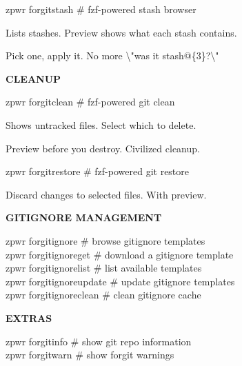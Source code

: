 \documentclass[11pt,a4paper,twoside]{book}
\begin{document}
\begin{codebox}
zpwr forgitstash          \# fzf-powered stash browser\\
\end{codebox}

Lists stashes. Preview shows what each stash contains.

Pick one, apply it. No more \textbackslash{}"was it stash@\{3\}?\textbackslash{}"


\vspace{12pt}
{\bfseries\color{neonyellow} CLEANUP}\vspace{4pt}

\begin{codebox}
zpwr forgitclean          \# fzf-powered git clean\\
\end{codebox}

Shows untracked files. Select which to delete.

Preview before you destroy. Civilized cleanup.

\begin{codebox}
zpwr forgitrestore        \# fzf-powered git restore\\
\end{codebox}

Discard changes to selected files. With preview.


\vspace{12pt}
{\bfseries\color{neonyellow} GITIGNORE MANAGEMENT}\vspace{4pt}

\begin{codebox}
zpwr forgitignore         \# browse gitignore templates\\
zpwr forgitignoreget      \# download a gitignore template\\
zpwr forgitignorelist     \# list available templates\\
zpwr forgitignoreupdate   \# update gitignore templates\\
zpwr forgitignoreclean    \# clean gitignore cache\\
\end{codebox}


\vspace{12pt}
{\bfseries\color{neonyellow} EXTRAS}\vspace{4pt}

\begin{codebox}
zpwr forgitinfo           \# show git repo information\\
zpwr forgitwarn           \# show forgit warnings\\
\end{codebox}
\end{document}
